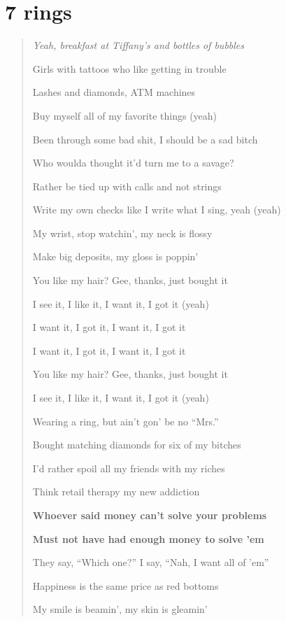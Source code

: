 \documentclass{book}
\numberwithin{equation}{section}
\begin{document}
\section{7 rings}

\begin{quotation}\it
    Yeah, breakfast at Tiffany's and bottles of bubbles
    
    Girls with tattoos who like getting in trouble
    
    Lashes and diamonds, ATM machines
    
    Buy myself all of my favorite things (yeah)
    
    Been through some bad shit, I should be a sad bitch
    
    Who woulda thought it'd turn me to a savage?
    
    Rather be tied up with calls and not strings
    
    Write my own checks like I write what I sing, yeah (yeah)
    
    My wrist, stop watchin', my neck is flossy
    
    Make big deposits, my gloss is poppin'
    
    You like my hair? Gee, thanks, just bought it
    
    I see it, I like it, I want it, I got it (yeah)
    
    I want it, I got it, I want it, I got it
    
    I want it, I got it, I want it, I got it
    
    You like my hair? Gee, thanks, just bought it
    
    I see it, I like it, I want it, I got it (yeah)
    
    Wearing a ring, but ain't gon' be no ``Mrs.''
    
    Bought matching diamonds for six of my bitches
    
    I'd rather spoil all my friends with my riches
    
    Think retail therapy my new addiction
    
    \textbf{Whoever said money can't solve your problems}
    
    \textbf{Must not have had enough money to solve 'em}
    
    They say, ``Which one?'' I say, ``Nah, I want all of 'em''
    
    Happiness is the same price as red bottoms
    
    My smile is beamin', my skin is gleamin'
    

\end{quotation}
\end{document}
